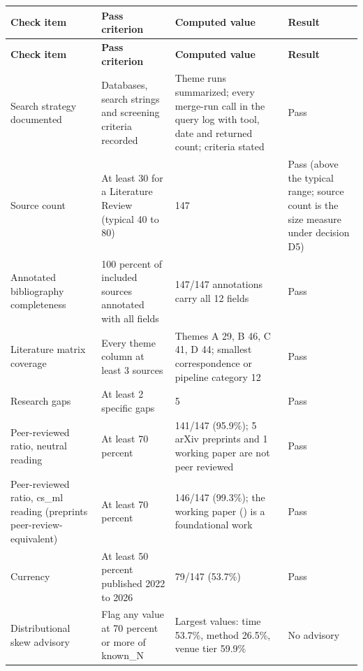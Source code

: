 \documentclass[journal,onecolumn]{IEEEtran}
\begin{document}
{\footnotesize
\setlength{\tabcolsep}{3pt}
\begin{longtable}{@{}>{\raggedright\arraybackslash\hspace{0pt}}p{}>{\raggedright\arraybackslash\hspace{0pt}}p{}>{\raggedright\arraybackslash\hspace{0pt}}p{}>{\raggedright\arraybackslash\hspace{0pt}}p{}@{}}
\toprule
\textbf{Check item} & \textbf{Pass criterion} & \textbf{Computed value} & \textbf{Result} \\
\midrule
\endfirsthead
\toprule
\textbf{Check item} & \textbf{Pass criterion} & \textbf{Computed value} & \textbf{Result} \\
\midrule
\endhead
\bottomrule
\endlastfoot
Search strategy documented & Databases, search strings and screening criteria recorded & Theme runs summarized; every merge-run call in the query log with tool, date and returned count; criteria stated & Pass \\
Source count & At least 30 for a Literature Review (typical 40 to 80) & 147 & Pass (above the typical range; source count is the size measure under decision D5) \\
Annotated bibliography completeness & 100 percent of included sources annotated with all fields & 147/147 annotations carry all 12 fields & Pass \\
Literature matrix coverage & Every theme column at least 3 sources & Themes A 29, B 46, C 41, D 44; smallest correspondence or pipeline category 12 & Pass \\
Research gaps & At least 2 specific gaps & 5 & Pass \\
Peer-reviewed ratio, neutral reading & At least 70 percent & 141/147 (95.9\%); 5 arXiv preprints and 1 working paper are not peer reviewed & Pass \\
Peer-reviewed ratio, cs\_ml reading (preprints peer-review-equivalent) & At least 70 percent & 146/147 (99.3\%); the working paper (\cite{Harshman1970Foundations}) is a foundational work & Pass \\
Currency & At least 50 percent published 2022 to 2026 & 79/147 (53.7\%) & Pass \\
Distributional skew advisory & Flag any value at 70 percent or more of known\_N & Largest values: time 53.7\%, method 26.5\%, venue tier 59.9\% & No advisory \\
\end{longtable}
}
\end{document}
